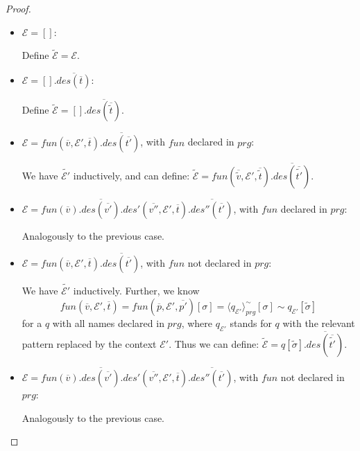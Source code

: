 \begin{proposition}
\begin{proof}
\begin{enumerate}
\begin{itemize}

\item $\mathcal{E} = []$:

Define $\widetilde{\mathcal{E}} = \mathcal{E}$.

\item $\mathcal{E} = [].\overline{des(\overline{t})}$:

Define $\widetilde{\mathcal{E}} = [].\overline{des(\overline{\widetilde{t}})}$.

\item $\mathcal{E} = fun(\overline{v}, \mathcal{E}', \overline{t}).\overline{des(\overline{t'})}$, with $fun$ declared in $prg$:

We have $\widetilde{\mathcal{E}'}$ inductively, and can define: $\widetilde{\mathcal{E}} = fun(\overline{\widetilde{v}}, \mathcal{E}', \overline{\widetilde{t}}).\overline{des(\overline{\widetilde{t'}})}$.

\item $\mathcal{E} = fun(\overline{v}).\overline{des(\overline{v'})}.des'(\overline{v''}, \mathcal{E}', \overline{t}).\overline{des''(\overline{t'})}$, with $fun$ declared in $prg$:

Analogously to the previous case.

\item $\mathcal{E} = fun(\overline{v}, \mathcal{E}', \overline{t}).\overline{des(\overline{t'})}$, with $fun$ not declared in $prg$:

We have $\widetilde{\mathcal{E}'}$ inductively. Further, we know
\begin{equation*}
fun(\overline{v}, \mathcal{E}', \overline{t}) = fun(\overline{p}, \mathcal{E}', \overline{p'})[\sigma] = \langle q_{\mathcal{E}'} \rangle^{\sim}_{prg}[\sigma] \sim q_{\mathcal{E}'}[\widetilde{\sigma}]
\end{equation*}
for a $q$ with all names declared in $prg$, where $q_{\mathcal{E}'}$ stands for $q$ with the relevant pattern replaced by the context $\mathcal{E}'$. Thus we can define: $\widetilde{\mathcal{E}} = q[\widetilde{\sigma}].\overline{des(\overline{\widetilde{t'}})}$.

\item $\mathcal{E} = fun(\overline{v}).\overline{des(\overline{v'})}.des'(\overline{v''}, \mathcal{E}', \overline{t}).\overline{des''(\overline{t'})}$, with $fun$ not declared in $prg$:

Analogously to the previous case.

\end{itemize}


\end{enumerate}
\end{proof}
\end{proposition}
